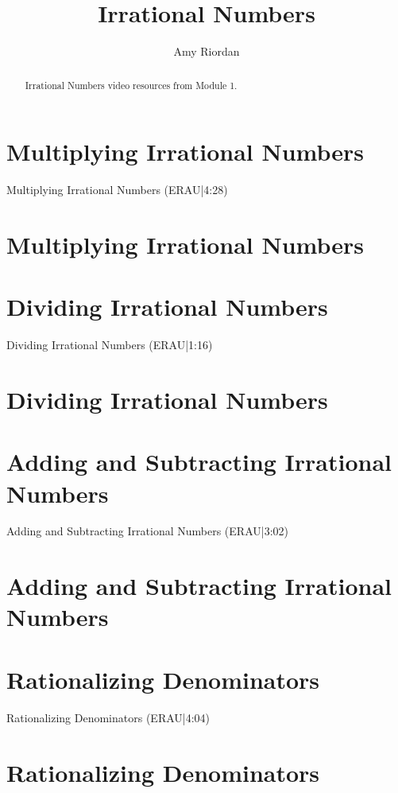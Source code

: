 \documentclass{ximera}
\title{Irrational Numbers}
\author{Amy Riordan}
\begin{document}
\begin{abstract}
Irrational Numbers video resources from Module 1.
\end{abstract}
\maketitle

\section*{Multiplying Irrational Numbers}

Multiplying Irrational Numbers (ERAU|4:28)


\section*{Multiplying Irrational Numbers}

\section*{Dividing Irrational Numbers}

Dividing Irrational Numbers (ERAU|1:16)


\section*{Dividing Irrational Numbers}

\section*{Adding and Subtracting Irrational Numbers}

Adding and Subtracting Irrational Numbers (ERAU|3:02)


\section*{Adding and Subtracting Irrational Numbers}

\section*{Rationalizing Denominators}

Rationalizing Denominators (ERAU|4:04)


\section*{Rationalizing Denominators}
\end{document}
